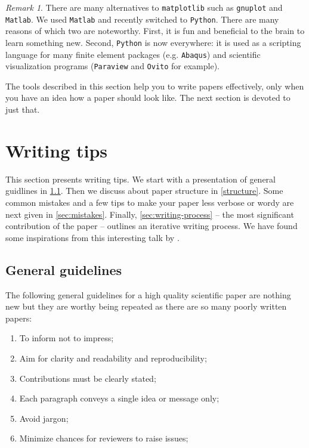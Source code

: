 \documentclass[authoryear,3p,times,preprint,review,fleqn]{elsarticle}
\numberwithin{equation}{section}
\theoremstyle{remark}
\newtheorem{rmk}{Remark}
\begin{document}
\begin{rmk}\label{rm:a}
There are many alternatives to \texttt{matplotlib} such as \texttt{gnuplot} and \texttt{Matlab}. We used  \texttt{Matlab} and recently switched to \texttt{Python}. There are many reasons of which two are noteworthy. First, it is fun and beneficial to the brain to learn something new. Second, \texttt{Python} is now everywhere: it is used as a scripting language for many finite element packages (e.g. \texttt{Abaqus}) and scientific visualization programs (\texttt{Paraview} and \texttt{Ovito} for example).
\end{rmk}


The tools described in this section help you to write papers effectively, only when you have an idea how a paper should look like. The next section is devoted to just that. 

\section{Writing tips}\label{sec:writing-tips}

This section presents  writing tips. We start with a presentation of general guidlines in \cref{sec:guidelines}. Then we  discuss about paper structure in \cref{structure}. Some common mistakes and a few tips to make your paper less verbose or wordy are next given in 
\cref{sec:mistakes}. Finally, \cref{sec:writing-process} -- the most significant contribution of the paper -- outlines an iterative writing process. We have found some inspirations from this interesting talk by \cite{Jones}.

\subsection{General guidelines}\label{sec:guidelines}

The following general guidelines for a high quality scientific paper are nothing new but they are worthy being repeated as there are so many poorly written papers:

\begin{enumerate}
\item To inform not to impress;
\item Aim for clarity and readability and  reproducibility;
\item Contributions must be clearly stated;
\item Each paragraph conveys a single idea or message only;
\item Avoid jargon;%
\item Minimize chances for reviewers to raise issues;
\end{enumerate}
\end{document}
